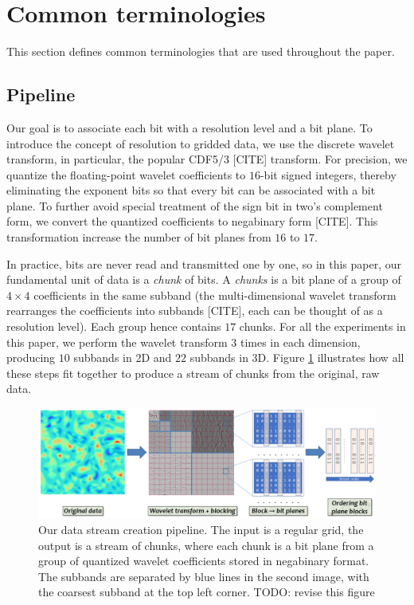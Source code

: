 \section{Common terminologies}
\label{sec:terminologies}

This section defines common terminologies that are used throughout the paper.

\subsection{Pipeline}

Our goal is to associate each bit with a resolution level and a bit plane. To introduce the concept
of resolution to gridded data, we use the discrete wavelet transform, in particular, the popular
CDF5/3 [CITE] transform. For precision, we quantize the floating-point wavelet coefficients to
$16$-bit signed integers, thereby eliminating the exponent bits so that every bit can be associated
with a bit plane. To further avoid special treatment of the sign bit in two's complement form, we
convert the quantized coefficients to negabinary form [CITE]. This transformation increase the
number of bit planes from $16$ to $17$.

In practice, bits are never read and transmitted one by one, so in this paper, our fundamental unit
of data is a \emph{chunk} of bits. A \emph{chunks} is a bit plane of a group of $4\times 4$
coefficients in the same subband (the multi-dimensional wavelet transform rearranges the
coefficients into subbands [CITE], each can be thought of as a resolution level). Each group hence
contains $17$ chunks. For all the experiments in this paper, we perform the wavelet transform $3$
times in each dimension, producing $10$ subbands in 2D and $22$ subbands in 3D. Figure
\ref{fig:pipeline} illustrates how all these steps fit together to produce a stream of chunks from
the original, raw data.

\begin{figure}
  \centering
  \includegraphics[width=\linewidth]{img/pipeline.png}
  \caption{Our data stream creation pipeline. The input is a regular grid, the output is a stream of
  chunks, where each chunk is a bit plane from a group of quantized wavelet coefficients stored in
  negabinary format. The subbands are separated by blue lines in the second image, with the coarsest
  subband at the top left corner. TODO: revise this figure}
  \label{fig:pipeline}
\end{figure}

